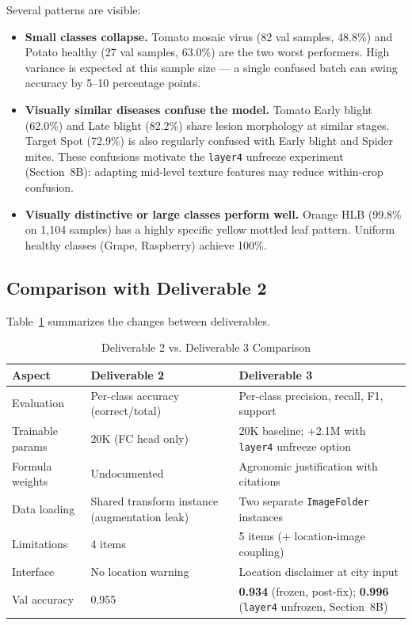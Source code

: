 \documentclass[conference]{IEEEtran}
\let\oldtexttt\texttt
\renewcommand{\texttt}[1]{{\small\oldtexttt{#1}}}
\begin{document}
Several patterns are visible:
\begin{itemize}
  \item \textbf{Small classes collapse.} Tomato mosaic virus (82 val samples, 48.8\%) and Potato healthy (27 val samples, 63.0\%) are the two worst performers. High variance is expected at this sample size --- a single confused batch can swing accuracy by 5--10 percentage points.
  \item \textbf{Visually similar diseases confuse the model.} Tomato Early blight (62.0\%) and Late blight (82.2\%) share lesion morphology at similar stages. Target Spot (72.9\%) is also regularly confused with Early blight and Spider mites. These confusions motivate the \texttt{layer4} unfreeze experiment (Section~8B): adapting mid-level texture features may reduce within-crop confusion.
  \item \textbf{Visually distinctive or large classes perform well.} Orange HLB (99.8\% on 1,104 samples) has a highly specific yellow mottled leaf pattern. Uniform healthy classes (Grape, Raspberry) achieve 100\%.
\end{itemize}

\subsection{Comparison with Deliverable 2}

Table~\ref{tab:d2d3} summarizes the changes between deliverables.

\begin{table}[t]
\caption{Deliverable 2 vs. Deliverable 3 Comparison}
\label{tab:d2d3}
\centering
\renewcommand{\arraystretch}{1.2}
\begin{tabular}{@{}p{1.8cm}p{2.6cm}p{3.0cm}@{}}
\toprule
\textbf{Aspect} & \textbf{Deliverable 2} & \textbf{Deliverable 3} \\
\midrule
Evaluation & Per-class accuracy (correct/total) & Per-class precision, recall, F1, support \\
Trainable params & 20K (FC head only) & 20K baseline; +2.1M with \texttt{layer4} unfreeze option \\
Formula weights & Undocumented & Agronomic justification with citations \\
Data loading & Shared transform instance (augmentation leak) & Two separate \texttt{ImageFolder} instances \\
Limitations & 4 items & 5 items (+ location-image coupling) \\
Interface & No location warning & Location disclaimer at city input \\
Val accuracy & 0.955 & \textbf{0.934} (frozen, post-fix); \textbf{0.996} (\texttt{layer4} unfrozen, Section~8B) \\
\bottomrule
\end{tabular}
\end{table}
\end{document}
